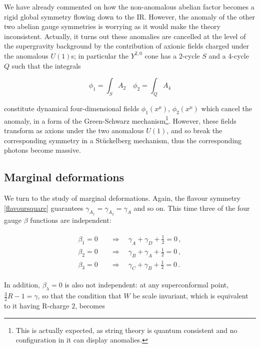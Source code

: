 We have already commented on how the non-anomalous abelian factor becomes a rigid global symmetry flowing down to the IR. However, the anomaly of the other two abelian gauge symmetries is worrying as it would make the theory inconsistent. Actually, it turns out these anomalies are cancelled at the level of the supergravity background by the contribution of axionic fields charged under the anomalous $U(1)$s; in particular the $Y^{2,0}$ cone has a 2-cycle $S$ and a 4-cycle $Q$ such that the integrals

\begin{equation}
	\phi_1 = \int_S A_2 \quad \phi_2 = \int_Q A_4
	\label{}
\end{equation}

constitute dynamical four-dimensional fields $\phi_1(x^\mu)$, $\phi_2(x^\mu)$ which cancel the anomaly, in a form of the Green-Schwarz mechanism\footnote{This is actually expected, as string theory is quantum consistent and no configuration in it can display anomalies.}. However, these fields transform as axions under the two anomalous $U(1)$, and so break the corresponding symmetry in a St\"uckelberg mechanism, thus the corresponding photons become massive.

\subsection{Marginal deformations}

We turn to the study of marginal deformations. Again, the flavour symmetry \eqref{flavoursquare} guarantees $\gamma_{A_1} = \gamma_{A_2} = \gamma_A$ and so on. This time three of the four gauge $\beta$ functions are independent:

\begin{align}
	\begin{split}
\beta_1 = 0 \quad	& \Rightarrow  \quad	\gamma_A + \gamma_D + \frac{1}{2} = 0\,, \\
\beta_2 = 0 \quad	&  \Rightarrow	\quad	\gamma_B + \gamma_A + \frac{1}{2} = 0\,, \\
\beta_3 = 0 \quad	&  \Rightarrow	\quad	\gamma_C + \gamma_B + \frac{1}{2} = 0\,.
	\end{split}
\end{align}

In addition, $\beta_\lambda = 0$ is also not independent: at any superconformal point, $\frac{3}{2}R - 1 = \gamma$, so that the condition that $W$ be scale invariant, which is equivalent to it having R-charge $2$, becomes

